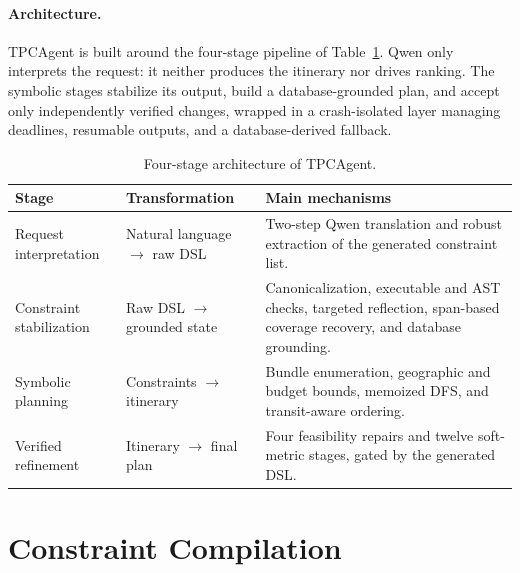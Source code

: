 \documentclass{article}
\begin{document}
\paragraph{Architecture.}
TPCAgent is built around the four-stage pipeline of
Table~\ref{tab:pipeline}. Qwen only interprets the request: it neither
produces the itinerary nor drives ranking. The symbolic stages stabilize
its output, build a database-grounded plan, and accept only independently
verified changes, wrapped in a crash-isolated layer managing deadlines,
resumable outputs, and a database-derived fallback.
 
\begin{table}[t]
\centering
\footnotesize
\setlength{\tabcolsep}{4.5pt}
\begin{tabular}{@{}p{3.0cm}p{4.7cm}p{8.1cm}@{}}
\toprule
Stage & Transformation & Main mechanisms \\
\midrule
Request interpretation & Natural language $\rightarrow$ raw DSL & Two-step Qwen translation and robust extraction of the generated constraint list. \\
Constraint stabilization & Raw DSL $\rightarrow$ grounded state & Canonicalization, executable and AST checks, targeted reflection, span-based coverage recovery, and database grounding. \\
Symbolic planning & Constraints $\rightarrow$ itinerary & Bundle enumeration, geographic and budget bounds, memoized DFS, and transit-aware ordering. \\
Verified refinement & Itinerary $\rightarrow$ final plan & Four feasibility repairs and twelve soft-metric stages, gated by the generated DSL. \\
\bottomrule
\end{tabular}
\caption{Four-stage architecture of TPCAgent.}
\label{tab:pipeline}
\end{table}
 
\section{Constraint Compilation}
 
\end{document}
